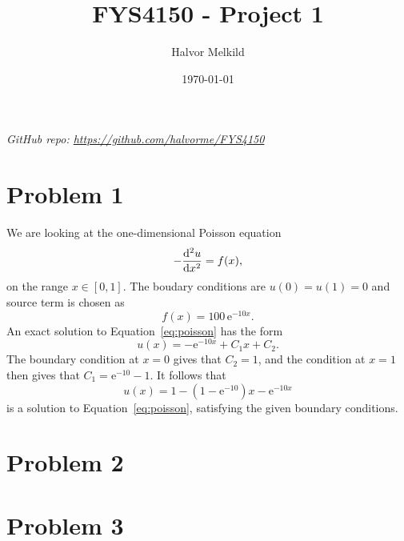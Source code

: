 \documentclass[english,notitlepage,aps,pra,10pt]{revtex4-2}
\newcommand{\e}{\mathrm{e}}
\begin{document}
\title{FYS4150 - Project 1}      %
\author{Halvor Melkild}          %
\date{\today}                             %
\noaffiliation                            %


\maketitle

\textit{GitHub repo: \href{https://github.com/halvorme/FYS4150/}{https://github.com/halvorme/FYS4150}}

\section*{Problem 1}

We are looking at the one-dimensional Poisson equation 
\begin{equation}
    -\dv[2]{u}{x} = f(x),
    \label{eq:poisson}
\end{equation}
on the range $x \in [0,1]$. The boudary conditions are $u(0) = u(1) = 0$ and source term is chosen as 
\begin{equation}
    f(x) = 100\, \e^{-10x}.
\end{equation}
An exact solution to Equation~\ref{eq:poisson} has the form 
\begin{equation}
    u(x) = -\e^{-10x} + C_1 x + C_2.
\end{equation}
The boundary condition at $x=0$ gives that $C_2 = 1$, and the condition at $x=1$ then gives that $C_1 = \e^{-10} - 1$. It follows that 
\begin{equation}
    u(x) = 1 - (1-\e^{-10})x - \e^{-10x} 
\end{equation}
is a solution to Equation~\ref{eq:poisson}, satisfying the given boundary conditions.


\section*{Problem 2}

\section*{Problem 3}
\end{document}
